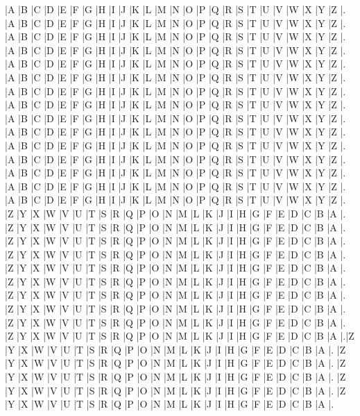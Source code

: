 \documentclass[10pt]{article}
\begin{document}
\PuzzleSolution
\begin{Puzzle}{10}{26}
|A |B |C |D |E |F |G |H |I |J |K |L |M |N |O |P |Q |R |S |T |U |V |W |X |Y |Z |.
|A |B |C |D |E |F |G |H |I |J |K |L |M |N |O |P |Q |R |S |T |U |V |W |X |Y |Z |.
|A |B |C |D |E |F |G |H |I |J |K |L |M |N |O |P |Q |R |S |T |U |V |W |X |Y |Z |.
|A |B |C |D |E |F |G |H |I |J |K |L |M |N |O |P |Q |R |S |T |U |V |W |X |Y |Z |.
|A |B |C |D |E |F |G |H |I |J |K |L |M |N |O |P |Q |R |S |T |U |V |W |X |Y |Z |.
|A |B |C |D |E |F |G |H |I |J |K |L |M |N |O |P |Q |R |S |T |U |V |W |X |Y |Z |.
|A |B |C |D |E |F |G |H |I |J |K |L |M |N |O |P |Q |R |S |T |U |V |W |X |Y |Z |.
|A |B |C |D |E |F |G |H |I |J |K |L |M |N |O |P |Q |R |S |T |U |V |W |X |Y |Z |.
|A |B |C |D |E |F |G |H |I |J |K |L |M |N |O |P |Q |R |S |T |U |V |W |X |Y |Z |.
|A |B |C |D |E |F |G |H |I |J |K |L |M |N |O |P |Q |R |S |T |U |V |W |X |Y |Z |.
|A |B |C |D |E |F |G |H |I |J |K |L |M |N |O |P |Q |R |S |T |U |V |W |X |Y |Z |.
|A |B |C |D |E |F |G |H |I |J |K |L |M |N |O |P |Q |R |S |T |U |V |W |X |Y |Z |.
|A |B |C |D |E |F |G |H |I |J |K |L |M |N |O |P |Q |R |S |T |U |V |W |X |Y |Z |.
|A |B |C |D |E |F |G |H |I |J |K |L |M |N |O |P |Q |R |S |T |U |V |W |X |Y |Z |.
|A |B |C |D |E |F |G |H |I |J |K |L |M |N |O |P |Q |R |S |T |U |V |W |X |Y |Z |.
|Z |Y |X |W |V |U |T |S |R |Q |P |O |N |M |L |K |J |I |H |G |F |E |D |C |B |A |.
|Z |Y |X |W |V |U |T |S |R |Q |P |O |N |M |L |K |J |I |H |G |F |E |D |C |B |A |.
|Z |Y |X |W |V |U |T |S |R |Q |P |O |N |M |L |K |J |I |H |G |F |E |D |C |B |A |.
|Z |Y |X |W |V |U |T |S |R |Q |P |O |N |M |L |K |J |I |H |G |F |E |D |C |B |A |.
|Z |Y |X |W |V |U |T |S |R |Q |P |O |N |M |L |K |J |I |H |G |F |E |D |C |B |A |.
|Z |Y |X |W |V |U |T |S |R |Q |P |O |N |M |L |K |J |I |H |G |F |E |D |C |B |A |.
|Z |Y |X |W |V |U |T |S |R |Q |P |O |N |M |L |K |J |I |H |G |F |E |D |C |B |A |.
|Z |Y |X |W |V |U |T |S |R |Q |P |O |N |M |L |K |J |I |H |G |F |E |D |C |B |A |.
|Z |Y |X |W |V |U |T |S |R |Q |P |O |N |M |L |K |J |I |H |G |F |E |D |C |B |A |.
|Z |Y |X |W |V |U |T |S |R |Q |P |O |N |M |L |K |J |I |H |G |F |E |D |C |B |A |.|Z |Y |X |W |V |U |T |S |R |Q |P |O |N |M |L |K |J |I |H |G |F |E |D |C |B |A |.
|Z |Y |X |W |V |U |T |S |R |Q |P |O |N |M |L |K |J |I |H |G |F |E |D |C |B |A |.
|Z |Y |X |W |V |U |T |S |R |Q |P |O |N |M |L |K |J |I |H |G |F |E |D |C |B |A |.
|Z |Y |X |W |V |U |T |S |R |Q |P |O |N |M |L |K |J |I |H |G |F |E |D |C |B |A |.
|Z |Y |X |W |V |U |T |S |R |Q |P |O |N |M |L |K |J |I |H |G |F |E |D |C |B |A |.
\end{Puzzle}
\end{document}
